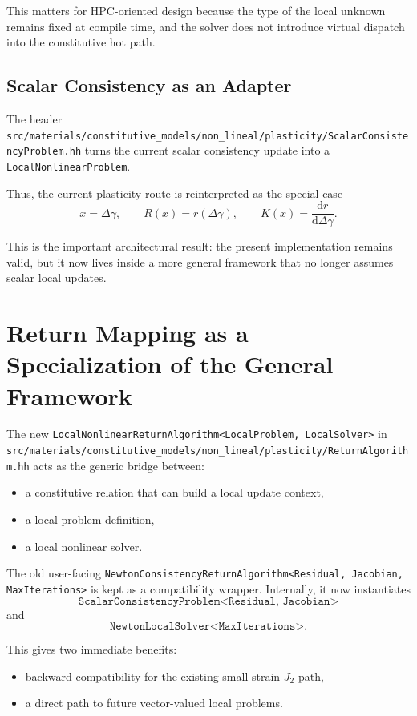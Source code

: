 This matters for HPC-oriented design because the type of the local unknown
remains fixed at compile time, and the solver does not introduce virtual
dispatch into the constitutive hot path.

\subsection{Scalar Consistency as an Adapter}

The header
\texttt{src/materials/constitutive\_models/non\_lineal/plasticity/ScalarConsistencyProblem.hh}
turns the current scalar consistency update into a \texttt{LocalNonlinearProblem}.

Thus, the current plasticity route is reinterpreted as the special case
\[
  x = \Delta\gamma, \qquad
  R(x) = r(\Delta\gamma), \qquad
  K(x) = \frac{\mathrm{d} r}{\mathrm{d}\Delta\gamma}.
\]

This is the important architectural result: the present implementation remains
valid, but it now lives inside a more general framework that no longer assumes
scalar local updates.

\section{Return Mapping as a Specialization of the General Framework}

The new
\texttt{LocalNonlinearReturnAlgorithm<LocalProblem, LocalSolver>}
in
\texttt{src/materials/constitutive\_models/non\_lineal/plasticity/ReturnAlgorithm.hh}
acts as the generic bridge between:
\begin{itemize}
  \item a constitutive relation that can build a local update context,
  \item a local problem definition,
  \item a local nonlinear solver.
\end{itemize}

The old user-facing
\texttt{NewtonConsistencyReturnAlgorithm<Residual, Jacobian, MaxIterations>}
is kept as a compatibility wrapper.  Internally, it now instantiates
\[
  \texttt{ScalarConsistencyProblem<Residual, Jacobian>}
\]
and
\[
  \texttt{NewtonLocalSolver<MaxIterations>}.
\]

This gives two immediate benefits:
\begin{itemize}
  \item backward compatibility for the existing small-strain $J_2$ path,
  \item a direct path to future vector-valued local problems.
\end{itemize}


